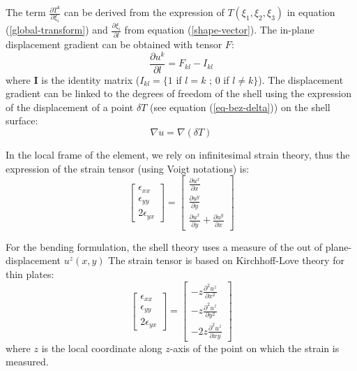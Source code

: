 \documentclass{egpubl}
\newcommand{\deriv}[2]{\frac{\partial #1}{\partial #2}}
\newcommand{\mat}[1]{\mathbf{#1}}
\begin{document}
The term $\deriv{T^k}{\xi_i}$ can be derived from the expression of $T(\xi_1,\xi_2, \xi_3)$ in equation (\ref{global-transform}) and 
$\deriv{\xi_i}{l}$ from equation (\ref{shape-vector}). 
The in-plane displacement gradient can be obtained with tensor $F$:
%
\begin{equation}
\deriv{u^k}{l} = F_{kl} - I_{kl} 
\end{equation}
%
where $\mat{I}$ is the identity matrix ($I_{kl}  = \{1$ if $l=k$ ;  $0$ if $l \neq k \} $). 
The displacement gradient can be linked to the degrees of freedom of the shell using the expression of the displacement of a point $\delta T$ (see equation  (\ref{eq-bez-delta})) on the shell surface:
\begin{equation}
    \nabla u = \nabla(\delta T)
\end{equation}

In the local frame of the element, we rely on infinitesimal strain theory, thus the expression of the strain tensor (using Voigt notations) is:
\begin{equation}\label{eq-in-plane-strain}
    \begin{bmatrix}
        \epsilon_{xx} \\ \epsilon_{yy} \\ 2\epsilon_{yx}
    \end{bmatrix}
    = 
    \begin{bmatrix}
        \deriv{u^x}{x}  \\[1mm]  \deriv{u^y}{y}  \\[1mm]  \deriv{u^x}{y} + \deriv{u^y}{x}
    \end{bmatrix}
\end{equation}

For the bending formulation, the shell theory uses a measure of the out of plane-displacement $u^z(x,y)$
The strain tensor is based on Kirchhoff-Love theory for thin plates:
\begin{equation}\label{out-plane-strain}
    \begin{bmatrix}
        \epsilon_{xx} \\ \epsilon_{yy} \\ 2\epsilon_{yx}
    \end{bmatrix}
    =
    \begin{bmatrix}
        -z \deriv{^2 u^z}{x^2}  \\[1mm]  -z \deriv{^2 u^z}{y^2}  \\[1mm]  - 2z \deriv{^2 u^z}{xy}
    \end{bmatrix}
\end{equation}
where $z$ is the local coordinate along $z$-axis of the point on which the strain is measured.
\end{document}
